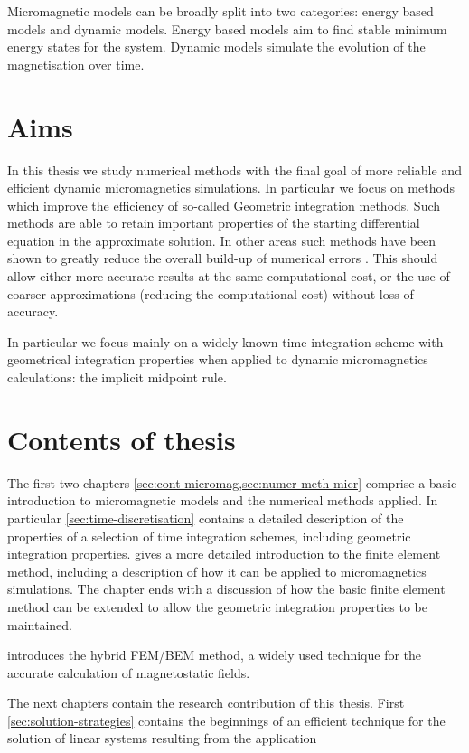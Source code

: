 Micromagnetic models can be broadly split into two categories: energy based models and dynamic models.
Energy based models aim to find stable minimum energy states for the system.
Dynamic models simulate the evolution of the magnetisation over time.

\section{Aims}

In this thesis we study numerical methods with the final goal of more reliable and efficient dynamic micromagnetics simulations.
In particular we focus on methods which improve the efficiency of so-called Geometric integration methods.
Such methods are able to retain important properties of the starting differential equation in the approximate solution.
In other areas such methods have been shown to greatly reduce the overall build-up of numerical errors \cite[77]{Iserles2009}.
This should allow either more accurate results at the same computational cost, or the use of coarser approximations (reducing the computational cost) without loss of accuracy.

In particular we focus mainly on a widely known time integration scheme with geometrical integration properties when applied to dynamic micromagnetics calculations: the implicit midpoint rule.


\section{Contents of thesis}

The first two chapters \cref{sec:cont-micromag,sec:numer-meth-micr} comprise a basic introduction to micromagnetic models and the numerical methods applied.
In particular \cref{sec:time-discretisation} contains a detailed description of the properties of a selection of time integration schemes, including geometric integration properties.
 gives a more detailed introduction to the finite element method, including a description of how it can be applied to micromagnetics simulations.
The chapter ends with a discussion of how the basic finite element method can be extended to allow the geometric integration properties to be maintained.

 introduces the hybrid FEM/BEM method, a widely used technique for the accurate calculation of magnetostatic fields.

The next chapters contain the research contribution of this thesis.
First \cref{sec:solution-strategies} contains the beginnings of an efficient technique for the solution of linear systems resulting from the application

